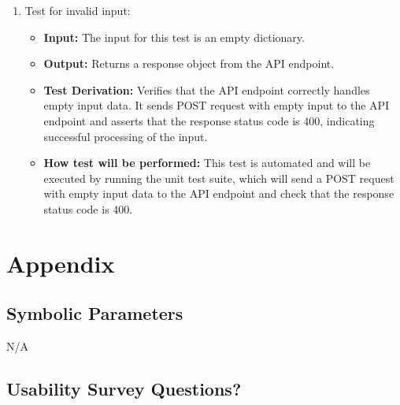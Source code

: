\documentclass[12pt, titlepage]{article}
\begin{document}
\begin{enumerate}
    \item Test for invalid input:
    \begin{itemize}
      \item \textbf{Input:} The input for this test is an empty dictionary. 
      \item \textbf{Output:} Returns a response object from the API endpoint. 
      \item \textbf{Test Derivation:} Verifies that the API endpoint correctly handles empty input data. It sends POST request with empty input to the API endpoint and asserts that the response status code is 400, indicating successful processing of the input.
      \item \textbf{How test will be performed:} This test is automated and will be executed by running the unit test suite, which will send a POST request with empty input data to the API endpoint and check that the response status code is 400.
    \end{itemize}
\end{enumerate}

\newpage
				






\newpage

\section{Appendix} \label{section:6}

\subsection{Symbolic Parameters}  \label{section:6.1}

N/A

\subsection{Usability Survey Questions?} \label{section:6.2}

\end{document}
